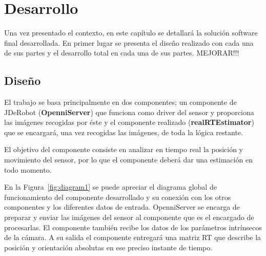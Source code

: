 
\chapter{Desarrollo}

\label{Chapter4} %

Una vez presentado el contexto, en este capítulo se detallará la solución software final desarrollada. En primer lugar se presenta el diseño realizado con cada una de sus partes y el desarrollo total en cada una de sus partes. MEJORAR!!!


\section{Diseño}

El trabajo se basa principalmente en dos componentes; un componente de JDeRobot (\textbf{OpenniServer}) que funciona como driver del sensor y proporciona las imágenes recogidas por éste y el componente realizado (\textbf{realRTEstimator}) que se encargará, una vez recogidas las imágenes, de toda la lógica restante.

El objetivo del componente consiste en analizar en tiempo real la posición y movimiento del sensor, por lo que el componente deberá dar una estimación en todo momento.

En la Figura~\ref{fig:diagram1} se puede apreciar el diagrama global de funcionamiento del componente desarrollado y su conexión con los otros componentes y los diferentes datos de entrada. OpenniServer se encarga de preparar y enviar las imágenes del sensor al componente que es el encargado de procesarlas. El componente también recibe los datos de los parámetros intrínsecos de la cámara. A su salida el componente entregará una matriz RT que describe la posición y orientación absolutas en ese preciso instante de tiempo. 

